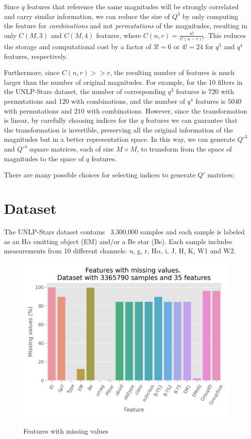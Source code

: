 \documentclass{article}
\begin{document}
Since $q$ features that reference the same magnitudes will be strongly correlated and carry similar information, we can reduce the size of $Q^3$ by only computing the feature for \emph{combinations} and not \emph{permutations} of the magnitudes, resulting in only $C(M,3)$ and $C(M,4)$ features, where $C(n,r)=\frac{n!}{r!(n-r)!}$. This reduces the storage and computational cost by a factor of $3! =6$ or $4! = 24$ for $q^3$ and $q^4$ features, respectively.

Furthermore, since $C(n,r)>>r$, the resulting number of features is much larger than the number of original magnitudes. For example, for the 10 filters in the UNLP-Stars dataset, the number of corresponding $q^3$ features is 720 with permutations and 120 with combinations, and the number of $q^4$ features is $5040$ with permutations and $210$ with combinations. However, since the transformation is linear, by carefully choosing indices for the $q$ features we can guarantee that the transformation is invertible, preserving all the original information of the magnitudes but in a better representation space. In this way, we can generate  $Q'^3$ and $Q'^4$ square matrices, each of size $M\times M$, to transform from the space of magnitudes to the space of $q$ features.

There are many possible choices for selecting indices to generate $Q'$ matrices; 

\section{Dataset}

The UNLP-Stars dataset contains ~3.300.000 samples and each sample is labeled as an H$α$ emitting object (EM) and/or a Be star (Be). Each sample includes measurements from 10 different channels: u, g, r, H$α$, i, J, H, K, W1 and W2.



\begin{figure}
    \includegraphics[width=1\linewidth]{plots/MissingValues/aidelman_missing.png}
    \label{fig:missing}
    \caption{Features with missing values}
\end{figure}
\end{document}
